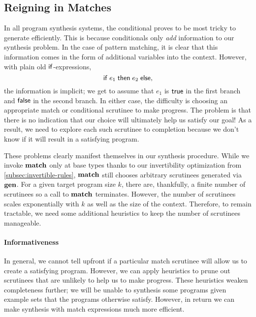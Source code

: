 \subsection{Reigning in Matches}
\label{subsec:reigning-in-matches}

In all program synthesis systems, the conditional proves to be most tricky to generate efficiently.
This is because conditionals only \emph{add} information to our synthesis problem.
In the case of pattern matching, it is clear that this information comes in the form of additional variables into the context.
However, with plain old $\mathsf{if}$-expressions,
\[
  \mathsf{if}\;e_1\;\mathsf{then}\;e_2\;\mathsf{else},
\]
the information is implicit; we get to assume that $e_1$ is $\mathsf{true}$ in the first branch and $\mathsf{false}$ in the second branch.
In either case, the difficulty is choosing an appropriate match or conditional scrutinee to make progress.
The problem is that there is no indication that our choice will ultimately help us satisfy our goal!
As a result, we need to explore each such scrutinee to completion because we don't know if it will result in a satisfying program.

These problems clearly manifest themselves in our synthesis procedure.
While we invoke $\mathbf{match}$ only at base types thanks to our invertibility optimization from \autoref{subsec:invertible-rules}, $\mathbf{match}$ still chooses arbitrary scrutinees generated via $\mathbf{gen}$.
For a given target program size $k$, there are, thankfully, a finite number of scrutinees so a call to $\mathbf{match}$ terminates.
However, the number of scrutinees scales exponentially with $k$ as well as the size of the context.
Therefore, to remain tractable, we need some additional heuristics to keep the number of scrutinees manageable.

\paragraph{Informativeness}
In general, we cannot tell upfront if a particular match scrutinee will allow us to create a satisfying program.
However, we can apply heuristics to prune out scrutinees that are unlikely to help us to make progress.
These heuristics weaken completeness further; we will be unable to synthesis some programs given example sets that the programs otherwise satisfy.
However, in return we can make synthesis with match expressions much more efficient.

